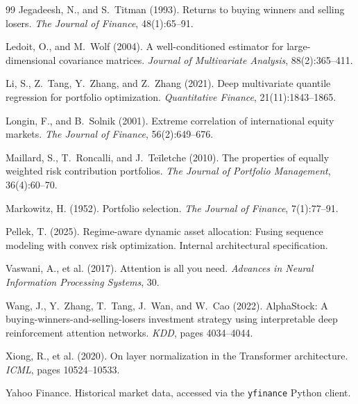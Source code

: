 \documentclass[11pt]{article}
\begin{document}
\begin{thebibliography}{99}
Jegadeesh, N., and S.~Titman (1993).
\newblock Returns to buying winners and selling losers.
\newblock \emph{The Journal of Finance}, 48(1):65--91.

Ledoit, O., and M.~Wolf (2004).
\newblock A well-conditioned estimator for large-dimensional covariance matrices.
\newblock \emph{Journal of Multivariate Analysis}, 88(2):365--411.

Li, S., Z.~Tang, Y.~Zhang, and Z.~Zhang (2021).
\newblock Deep multivariate quantile regression for portfolio optimization.
\newblock \emph{Quantitative Finance}, 21(11):1843--1865.

Longin, F., and B.~Solnik (2001).
\newblock Extreme correlation of international equity markets.
\newblock \emph{The Journal of Finance}, 56(2):649--676.

Maillard, S., T.~Roncalli, and J.~Te\"iletche (2010).
\newblock The properties of equally weighted risk contribution portfolios.
\newblock \emph{The Journal of Portfolio Management}, 36(4):60--70.

Markowitz, H. (1952).
\newblock Portfolio selection.
\newblock \emph{The Journal of Finance}, 7(1):77--91.

Pellek, T. (2025).
\newblock Regime-aware dynamic asset allocation: Fusing sequence modeling with convex risk optimization.
\newblock Internal architectural specification.

Vaswani, A., et al. (2017).
\newblock Attention is all you need.
\newblock \emph{Advances in Neural Information Processing Systems}, 30.

Wang, J., Y.~Zhang, T.~Tang, J.~Wan, and W.~Cao (2022).
\newblock AlphaStock: A buying-winners-and-selling-losers investment strategy
using interpretable deep reinforcement attention networks.
\newblock \emph{KDD}, pages 4034--4044.

Xiong, R., et al. (2020).
\newblock On layer normalization in the Transformer architecture.
\newblock \emph{ICML}, pages 10524--10533.

Yahoo Finance.
\newblock Historical market data, accessed via the \texttt{yfinance} Python client.

\end{thebibliography}
\end{document}
